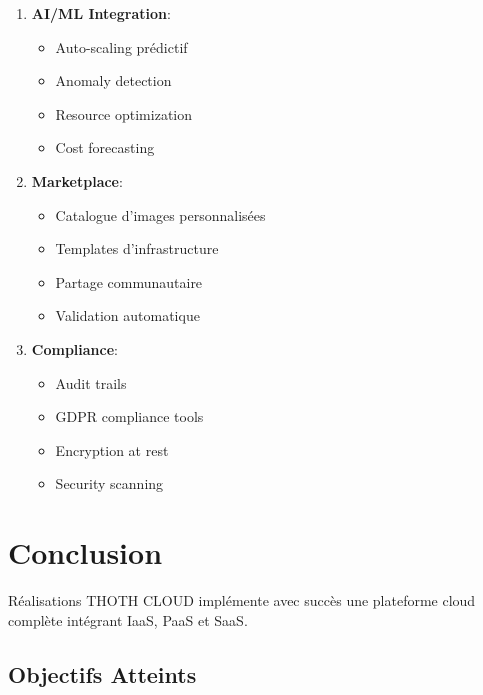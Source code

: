 \documentclass[12pt,a4paper]{article}
\begin{document}
\begin{enumerate}
    \item \textbf{AI/ML Integration}:
    \begin{itemize}
        \item Auto-scaling prédictif
        \item Anomaly detection
        \item Resource optimization
        \item Cost forecasting
    \end{itemize}
    
    \item \textbf{Marketplace}:
    \begin{itemize}
        \item Catalogue d'images personnalisées
        \item Templates d'infrastructure
        \item Partage communautaire
        \item Validation automatique
    \end{itemize}
    
    \item \textbf{Compliance}:
    \begin{itemize}
        \item Audit trails
        \item GDPR compliance tools
        \item Encryption at rest
        \item Security scanning
    \end{itemize}
\end{enumerate}

\section{Conclusion}

\begin{successbox}{Réalisations}
THOTH CLOUD implémente avec succès une plateforme cloud complète intégrant IaaS, PaaS et SaaS.
\end{successbox}

\subsection{Objectifs Atteints}
\end{document}
